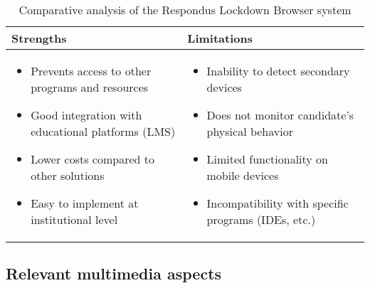 \documentclass[12pt,a4paper]{article}
\begin{document}
\begin{table}[H]
    \centering
    \begin{tabular}{|p{7.5cm}|p{7.5cm}|}
    \hline
    \textbf{Strengths} & \textbf{Limitations} \\
    \hline
    \begin{itemize}
        \item Prevents access to other programs and resources
        \item Good integration with educational platforms (LMS)
        \item Lower costs compared to other solutions
        \item Easy to implement at institutional level
    \end{itemize} & 
    \begin{itemize}
        \item Inability to detect secondary devices
        \item Does not monitor candidate's physical behavior
        \item Limited functionality on mobile devices
        \item Incompatibility with specific programs (IDEs, etc.)
    \end{itemize} \\
    \hline
    \end{tabular}
    \caption{Comparative analysis of the Respondus Lockdown Browser system}
\end{table}

\subsection{Relevant multimedia aspects}
\end{document}
